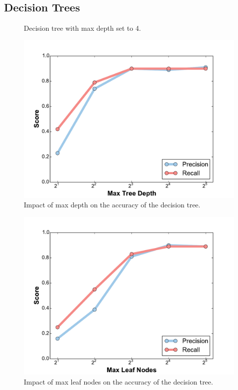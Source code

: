 \subsection{Decision Trees}
\label{sec:dt}

\begin{figure}[h!]
    \centering
    \caption{Decision tree with max depth set to 4.}
    \label{fig:tree_sample}
\end{figure}

\begin{figure}[h!]
    \centering
	\includegraphics[width=0.7\linewidth]{figure/depth.pdf}
	\caption{Impact of max depth on the accuracy of the decision tree.}
	\label{fig:tree_depth}
\end{figure}

\begin{figure}[h!]
    \centering
	\includegraphics[width=0.7\linewidth]{figure/leaves.pdf}
	\caption{Impact of max leaf nodes on the accuracy of the decision tree.}
	\label{fig:tree_leaves}
\end{figure}

